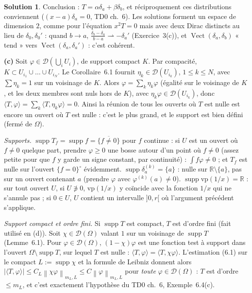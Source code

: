 \documentclass[11pt,a4paper]{article}
\newcommand{\R}{\mathbb{R}}
\newcommand{\Vect}{\operatorname{Vect}}
\newcommand{\norm}[1]{\left\|#1\right\|}
\newcommand{\wk}{\rightharpoonup}
\DeclareMathOperator{\supp}{supp}
\newcommand{\D}{\mathcal{D}}
\theoremstyle{definition}
\newtheorem*{solution}{Solution}
\begin{document}
\begin{solution}
Conclusion : $T=\alpha\delta_a+\beta\delta_b$, et réciproquement ces distributions conviennent ($(x-a)\delta_a=0$, TD0 ch.~6). Les solutions forment un espace de dimension $2$, comme pour l'équation $x^2T=0$ mais avec deux Dirac distincts au lieu de $\delta_0,\delta_0'$ : quand $b\to a$, $\frac{\delta_b-\delta_a}{b-a}\wk-\delta_a'$ (Exercice~3(c)), et $\Vect(\delta_a,\delta_b)$ « tend » vers $\Vect(\delta_a,\delta_a')$ : c'est cohérent.

\medskip
\noindent\textbf{(c)} Soit $\varphi\in\D(\bigcup_iU_i)$, de support compact $K$. Par compacité, $K\subset U_{i_1}\cup\dots\cup U_{i_N}$. Le Corollaire~6.1 fournit $\eta_k\in\D(U_{i_k})$, $1\le k\le N$, avec $\sum\eta_k=1$ sur un voisinage de $K$. Alors $\varphi=\sum_k\eta_k\varphi$ (égalité sur le voisinage de $K$, et les deux membres sont nuls hors de $K$), avec $\eta_k\varphi\in\D(U_{i_k})$, donc $\langle T,\varphi\rangle=\sum_k\langle T,\eta_k\varphi\rangle=0$. Ainsi la réunion de tous les ouverts où $T$ est nulle est encore un ouvert où $T$ est nulle : c'est le plus grand, et le support est bien défini (fermé de $\Omega$).

\emph{Supports.} $\supp T_f=\supp f=\overline{\{f\ne0\}}$ pour $f$ continue : si $U$ est un ouvert où $f\ne0$ quelque part, prendre $\varphi\ge0$ une bosse autour d'un point où $f\ne0$ (assez petite pour que $f$ y garde un signe constant, par continuité) : $\int f\varphi\ne0$ ; et $T_f$ est nulle sur l'ouvert $\{f=0\}^\circ$ évidemment. $\supp\delta_a^{(k)}=\{a\}$ : nulle sur $\R\setminus\{a\}$, pas sur un ouvert contenant $a$ (prendre $\varphi$ avec $\varphi^{(k)}(a)\ne0$). $\supp\mathrm{vp}(1/x)=\R$ : sur tout ouvert $U$, si $U\not\ni0$, $\mathrm{vp}(1/x)$ y coïncide avec la fonction $1/x$ qui ne s'annule pas ; si $0\in U$, $U$ contient un intervalle $]0,r[$ où l'argument précédent s'applique.

\emph{Support compact et ordre fini.} Si $\supp T$ est compact, $T$ est d'ordre fini (fait utilisé en (d)). Soit $\chi\in\D(\Omega)$ valant $1$ sur un voisinage de $\supp T$ (Lemme~6.1). Pour $\varphi\in\D(\Omega)$, $(1-\chi)\varphi$ est une fonction test à support dans l'ouvert $\Omega\setminus\supp T$, sur lequel $T$ est nulle : $\langle T,\varphi\rangle=\langle T,\chi\varphi\rangle$. L'estimation (6.1) sur le compact $L:=\supp\chi$ et la formule de Leibniz donnent alors $|\langle T,\varphi\rangle|\le C_L\norm{\chi\varphi}_{m_L,L}\le C\norm\varphi_{m_L,L}$ pour \emph{toute} $\varphi\in\D(\Omega)$ : $T$ est d'ordre $\le m_L$, et c'est exactement l'hypothèse du TD0 ch.~6, Exemple~6.4(c).


\end{solution}
\end{document}
